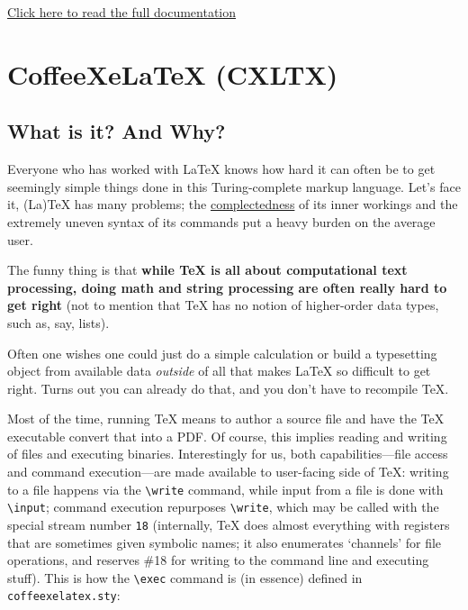 \href{https://github.com/loveencounterflow/cxltx/raw/master/cxltx-manual.pdf}{Click
here to read the full documentation}

\section{CoffeeXeLaTeX (CXLTX)}\label{coffeexelatex-cxltx}

\subsection{What is it? And Why?}\label{what-is-it-and-why}

Everyone who has worked with LaTeX knows how hard it can often be to get
seemingly simple things done in this Turing-complete markup language.
Let's face it, (La)TeX has many problems; the
\href{http://www.infoq.com/presentations/Simple-Made-Easy}{complectedness}
of its inner workings and the extremely uneven syntax of its commands
put a heavy burden on the average user.

The funny thing is that \textbf{while TeX is all about computational
text processing, doing math and string processing are often really hard
to get right} (not to mention that TeX has no notion of higher-order
data types, such as, say, lists).

Often one wishes one could just do a simple calculation or build a
typesetting object from available data \emph{outside} of all that makes
LaTeX so difficult to get right. Turns out you can already do that, and
you don't have to recompile TeX.

Most of the time, running TeX means to author a source file and have the
TeX executable convert that into a PDF. Of course, this implies reading
and writing of files and executing binaries. Interestingly for us, both
capabilities---file access and command execution---are made available to
user-facing side of TeX: writing to a file happens via the
\texttt{\textbackslash{}write} command, while input from a file is done
with \texttt{\textbackslash{}input}; command execution repurposes
\texttt{\textbackslash{}write}, which may be called with the special
stream number \texttt{18} (internally, TeX does almost everything with
registers that are sometimes given symbolic names; it also enumerates
`channels' for file operations, and reserves \#18 for writing to the
command line and executing stuff). This is how the
\texttt{\textbackslash{}exec} command is (in essence) defined in
\texttt{coffeexelatex.sty}:

